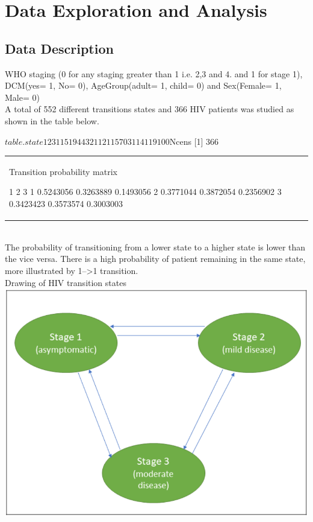 \documentclass[11pt,a4paper]{article}
\begin{document}
\section{Data Exploration and Analysis}
  \subsection{Data Description}
WHO staging (0 for any staging greater than 1 i.e. 2,3 and 4. and 1 for stage 1), DCM(yes= 1, No= 0), AgeGroup(adult= 1, child= 0) and Sex(Female= 1, Male= 0)  \\
A total of 552 different transitions states and 366 HIV patients was studied as shown in the table below.


\begin{minipage}{0.45\textwidth}
\begin{Schunk}
\begin{Soutput}
$table.state
    1   2   3
1 151  94  43
2 112 115  70
3 114 119 100

$Ncens
[1] 366
\end{Soutput}
\end{Schunk}
\end{minipage}%
\hfill
\begin{minipage}{0.45\textwidth}
\begin{tabular}{|p{\textwidth}}
Transition probability matrix
\begin{Schunk}
\begin{Soutput}
            1         2         3
  1 0.5243056 0.3263889 0.1493056
  2 0.3771044 0.3872054 0.2356902
  3 0.3423423 0.3573574 0.3003003
\end{Soutput}
\end{Schunk}
\end{tabular}
\end{minipage}%
\\

The probability of transitioning from a lower state to a higher state is lower than the vice versa. There is a high probability of patient remaining in the same state, more illustrated by 1-->1 transition.\\

Drawing of HIV transition states\\
\includegraphics[scale=0.2]{diagram2.PNG}
\end{document}
